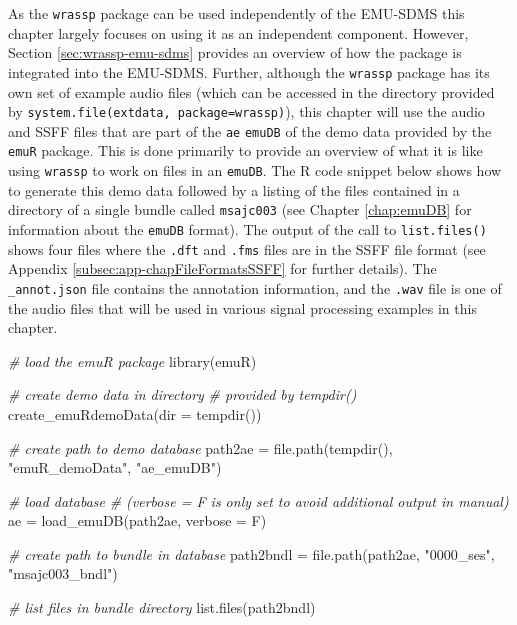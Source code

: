 \documentclass[
]{book}
\newenvironment{Shaded}{\begin{snugshade}}{\end{snugshade}}
\newcommand{\AttributeTok}[1]{\textcolor[rgb]{0.77,0.63,0.00}{#1}}
\newcommand{\CommentTok}[1]{\textcolor[rgb]{0.56,0.35,0.01}{\textit{#1}}}
\newcommand{\FunctionTok}[1]{\textcolor[rgb]{0.00,0.00,0.00}{#1}}
\newcommand{\NormalTok}[1]{#1}
\newcommand{\OtherTok}[1]{\textcolor[rgb]{0.56,0.35,0.01}{#1}}
\newcommand{\StringTok}[1]{\textcolor[rgb]{0.31,0.60,0.02}{#1}}
\begin{document}
As the \texttt{wrassp} package can be used independently of the EMU-SDMS this chapter largely focuses on using it as an independent component. However, Section \ref{sec:wrassp-emu-sdms} provides an overview of how the package is integrated into the EMU-SDMS. Further, although the \texttt{wrassp} package has its own set of example audio files (which can be accessed in the directory provided by \texttt{system.file(\textquotesingle{}extdata\textquotesingle{},\ package=\textquotesingle{}wrassp\textquotesingle{})}), this chapter will use the audio and SSFF files that are part of the \texttt{ae} \texttt{emuDB} of the demo data provided by the \texttt{emuR} package. This is done primarily to provide an overview of what it is like using \texttt{wrassp} to work on files in an \texttt{emuDB}. The R code snippet below shows how to generate this demo data followed by a listing of the files contained in a directory of a single bundle called \texttt{msajc003} (see Chapter \ref{chap:emuDB} for information about the \texttt{emuDB} format). The output of the call to \texttt{list.files()} shows four files where the \texttt{.dft} and \texttt{.fms} files are in the SSFF file format (see Appendix \ref{subsec:app-chapFileFormatsSSFF} for further details). The \texttt{\_annot.json} file contains the annotation information, and the \texttt{.wav} file is one of the audio files that will be used in various signal processing examples in this chapter.

\begin{Shaded}
\begin{Highlighting}[]
\CommentTok{\# load the emuR package}
\FunctionTok{library}\NormalTok{(emuR)}

\CommentTok{\# create demo data in directory}
\CommentTok{\# provided by tempdir()}
\FunctionTok{create\_emuRdemoData}\NormalTok{(}\AttributeTok{dir =} \FunctionTok{tempdir}\NormalTok{())}

\CommentTok{\# create path to demo database}
\NormalTok{path2ae }\OtherTok{=} \FunctionTok{file.path}\NormalTok{(}\FunctionTok{tempdir}\NormalTok{(), }\StringTok{"emuR\_demoData"}\NormalTok{, }\StringTok{"ae\_emuDB"}\NormalTok{)}

\CommentTok{\# load database}
\CommentTok{\# (verbose = F is only set to avoid additional output in manual)}
\NormalTok{ae }\OtherTok{=} \FunctionTok{load\_emuDB}\NormalTok{(path2ae, }\AttributeTok{verbose =}\NormalTok{ F)}

\CommentTok{\# create path to bundle in database}
\NormalTok{path2bndl }\OtherTok{=} \FunctionTok{file.path}\NormalTok{(path2ae, }\StringTok{"0000\_ses"}\NormalTok{, }\StringTok{"msajc003\_bndl"}\NormalTok{)}

\CommentTok{\# list files in bundle directory}
\FunctionTok{list.files}\NormalTok{(path2bndl)}
\end{Highlighting}
\end{Shaded}
\end{document}
